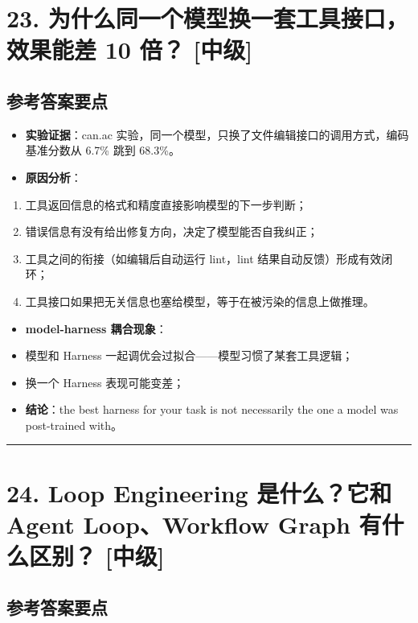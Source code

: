 \documentclass[9pt,a4paper,twocolumn]{ctexart}
\newcommand{\lvzhong}{\usebox{\badgezhongbox}}
\def\lvzhong{[中级]}%
\begin{document}
\section*{23. 为什么同一个模型换一套工具接口，效果能差 10 倍？ \lvzhong{}}


\subsection*{参考答案要点}

\begin{itemize}[itemsep=1pt, topsep=2pt]
  \item \textbf{实验证据}：can.ac 实验，同一个模型，只换了文件编辑接口的调用方式，编码基准分数从 6.7\% 跳到 68.3\%。
  \item \textbf{原因分析}：
\end{itemize}
\begin{enumerate}[itemsep=1pt, topsep=2pt]
  \item 工具返回信息的格式和精度直接影响模型的下一步判断；
  \item 错误信息有没有给出修复方向，决定了模型能否自我纠正；
  \item 工具之间的衔接（如编辑后自动运行 lint，lint 结果自动反馈）形成有效闭环；
  \item 工具接口如果把无关信息也塞给模型，等于在被污染的信息上做推理。
\end{enumerate}
\begin{itemize}[itemsep=1pt, topsep=2pt]
  \item \textbf{model-harness 耦合现象}：
  \item 模型和 Harness 一起调优会过拟合——模型习惯了某套工具逻辑；
  \item 换一个 Harness 表现可能变差；
  \item \textbf{结论}：the best harness for your task is not necessarily the one a model was post-trained with。
\end{itemize}


\vspace{2pt}
\noindent\rule{\columnwidth}{0.3pt}\vspace{2pt}



\section*{24. Loop Engineering 是什么？它和 Agent Loop、Workflow Graph 有什么区别？ \lvzhong{}}


\subsection*{参考答案要点}
\end{document}

